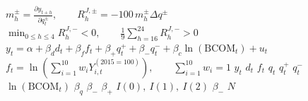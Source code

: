 \documentclass{article}
\begin{document}
\newpage
\vspace*{0.15in}\noindent\(\displaystyle m_h^{\pm}=\frac{\partial y_{t+h}}{\partial q_t^\pm},\qquad R_h^{J,\pm}=-100\,m_h^\pm\Delta q^\pm\)
\newpage
\vspace*{0.15in}\noindent\(\displaystyle \min_{0\leq h\leq4}R_h^{J,-}<0,\qquad \frac{1}{9}\sum_{h=16}^{24}R_h^{J,-}>0\)
\newpage
\vspace*{0.15in}\noindent\(\displaystyle y_t=\alpha+\beta_d d_t+\beta_f f_t+\beta_+q_t^++\beta_-q_t^-+\beta_c\ln(\mathrm{BCOM}_t)+u_t\)
\newpage
\vspace*{0.15in}\noindent\(\displaystyle f_t=\ln\!\left(\sum_{i=1}^{10}w_iY_{i,t}^{(2015=100)}\right),\qquad \sum_{i=1}^{10}w_i=1\)
\newpage
\vspace*{0.15in}\noindent\(\displaystyle y_t\)
\newpage
\vspace*{0.15in}\noindent\(\displaystyle d_t\)
\newpage
\vspace*{0.15in}\noindent\(\displaystyle f_t\)
\newpage
\vspace*{0.15in}\noindent\(\displaystyle q_t\)
\newpage
\vspace*{0.15in}\noindent\(\displaystyle q_t^+\)
\newpage
\vspace*{0.15in}\noindent\(\displaystyle q_t^-\)
\newpage
\vspace*{0.15in}\noindent\(\displaystyle \ln(\mathrm{BCOM}_t)\)
\newpage
\vspace*{0.15in}\noindent\(\displaystyle \beta_q\)
\newpage
\vspace*{0.15in}\noindent\(\displaystyle \beta_-\)
\newpage
\vspace*{0.15in}\noindent\(\displaystyle \beta_+\)
\newpage
\vspace*{0.15in}\noindent\(\displaystyle I(0),\ I(1),\ I(2)\)
\newpage
\vspace*{0.15in}\noindent\(\displaystyle \beta_-\)
\newpage
\vspace*{0.15in}\noindent\(\displaystyle N\)
\end{document}
